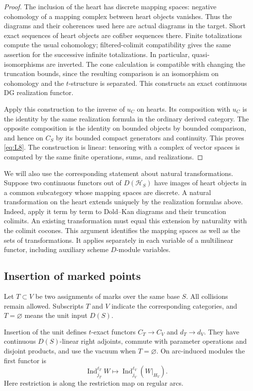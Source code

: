 \begin{proof}
The inclusion of the heart has discrete mapping spaces: negative
cohomology of a mapping complex between heart objects vanishes.
Thus the diagrams and their coherences used here are actual diagrams
in the target.  Short exact sequences of heart objects are cofiber
sequences there.  Finite totalizations compute the usual cohomology;
filtered-colimit compatibility gives the same assertion for the
successive infinite totalizations.  In particular, quasi-isomorphisms
are inverted.  The cone calculation is compatible with changing the
truncation bounds, since the resulting comparison is an isomorphism
on cohomology and the $t$-structure is separated.  This constructs an
exact continuous DG realization functor.

Apply this construction to the inverse of $u_C$ on hearts.  Its
composition with $u_C$ is the identity by the same realization formula
in the ordinary derived category.  The opposite composition is the
identity on bounded objects by bounded comparison, and hence on $C_S$
by its bounded compact generators and continuity.  This proves
\eqref{eq:L8}.  The construction is linear: tensoring with a complex
of vector spaces is computed by the same finite operations, sums,
and realizations.
\end{proof}

We will also use the corresponding statement about natural
transformations.  Suppose two continuous functors out of
$D(\mathcal H_S)$ have images of heart objects in a common subcategory
whose mapping spaces are discrete.  A natural transformation on the
heart extends uniquely by the realization formulas above.  Indeed,
apply it term by term to Dold--Kan diagrams and their truncation
colimits.  An existing transformation must equal this extension by
naturality with the colimit cocones.  This argument identifies the
mapping spaces as well as the sets of transformations.  It applies
separately in each variable of a multilinear functor, including
auxiliary scheme $D$-module variables.

\subsection{Insertion of marked points}

Let $T\subset V$ be two assignments of marks over the same base $S$.
All collisions remain allowed.  Subscripts $T$ and $V$ indicate the
corresponding categories, and $T=\varnothing$ means the unit input
$D(S)$.

\begin{lemma}\label{local:insertion}
Insertion of the unit defines $t$-exact functors
$C_T\to C_V$ and $d_T\to d_V$.  They have continuous $D(S)$-linear
right adjoints, commute with parameter operations and disjoint
products, and use the vacuum when $T=\varnothing$.
On arc-induced modules the first functor is
\begin{equation}\label{eq:L9}
 \operatorname{Ind}_{j_T}^{\ell_T}W
       \longmapsto
 \operatorname{Ind}_{j_V}^{\ell_V}(W|_{H_V}).
\end{equation}
Here restriction is along the restriction map on regular arcs.
\end{lemma}

